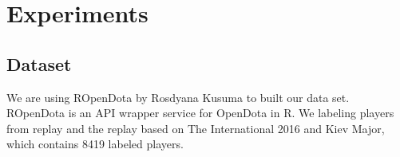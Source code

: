 \section{Experiments}
\label{sec:exp}

\subsection{Dataset}
\label{sec:dataset}

We are using ROpenDota by Rosdyana Kusuma to built our data set. ROpenDota is an API wrapper service for OpenDota in R. We labeling players from replay and the replay based on The International 2016 and Kiev Major, which contains 8419 labeled players. 